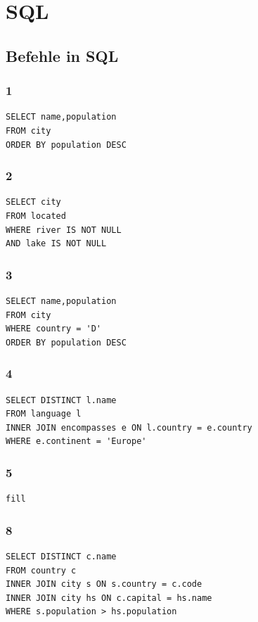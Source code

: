 \section{SQL}
\subsection{Befehle in SQL}
\subsubsection{1}
\begin{lstlisting}
SELECT name,population
FROM city
ORDER BY population DESC
\end{lstlisting}
\subsubsection{2}
\begin{lstlisting}
SELECT city
FROM located
WHERE river IS NOT NULL
AND lake IS NOT NULL
\end{lstlisting}
\subsubsection{3}
\begin{lstlisting}
SELECT name,population
FROM city
WHERE country = 'D'
ORDER BY population DESC
\end{lstlisting}
\subsubsection{4}
\begin{lstlisting}
SELECT DISTINCT l.name 
FROM language l 
INNER JOIN encompasses e ON l.country = e.country
WHERE e.continent = 'Europe'
\end{lstlisting}
\subsubsection{5}
\begin{lstlisting}
fill
\end{lstlisting}
\subsubsection{8}
\begin{lstlisting}
SELECT DISTINCT c.name 
FROM country c
INNER JOIN city s ON s.country = c.code
INNER JOIN city hs ON c.capital = hs.name
WHERE s.population > hs.population
\end{lstlisting}
